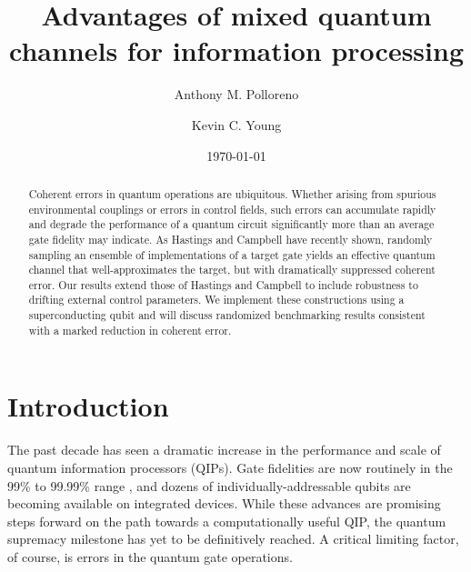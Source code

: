 \documentclass[aps,nofootinbib,pra,notitlepage,twocolumn]{revtex4-1}
\begin{document}
\title{Advantages of mixed quantum channels for information processing}

\author{Anthony M. Polloreno}

\author{Kevin C. Young}

\date{\today}

\begin{abstract}
Coherent errors in quantum operations are ubiquitous. Whether arising from spurious environmental couplings or errors in control fields, such errors can accumulate rapidly and degrade the performance of a quantum circuit significantly more than an average gate fidelity may indicate. As Hastings and Campbell have recently shown, randomly sampling an ensemble of implementations of a target gate yields an effective quantum channel that well-approximates the target, but with dramatically suppressed coherent error. Our results extend those of Hastings and Campbell to include robustness to drifting external control parameters. We implement these constructions using a superconducting qubit and will discuss randomized benchmarking results consistent with a marked reduction in coherent error.
\end{abstract}

\pacs{}

\maketitle


\section{Introduction}
\label{sec:introduction}

The past decade has seen a dramatic increase in the performance and scale of quantum information processors (QIPs). Gate fidelities are now routinely in the 99\% to 99.99\% range \cite{Barends2014, Ballance2016, 1901.08035}, and dozens of individually-addressable qubits are becoming available on integrated devices. While these advances are promising steps forward on the path towards a computationally useful QIP, the quantum supremacy \cite{1203.5813} milestone has yet to be definitively reached. A critical limiting factor, of course, is errors in the quantum gate operations.
\end{document}

